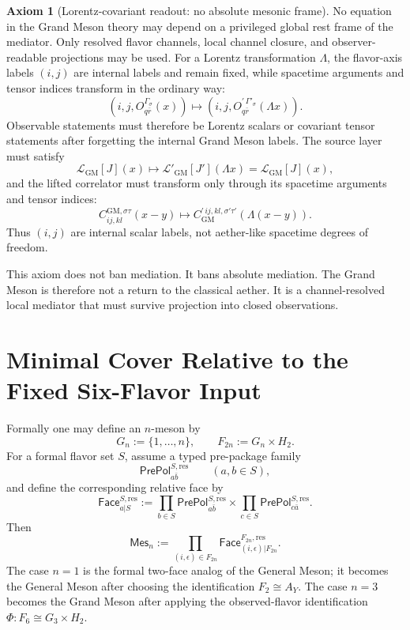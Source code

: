 \documentclass[11pt]{article}
\theoremstyle{definition}
\newtheorem{axiom}[definition]{Axiom}
\theoremstyle{plain}
\begin{document}
\begin{axiom}[Lorentz-covariant readout: no absolute mesonic frame]
No equation in the Grand Meson theory may depend on a privileged global
rest frame of the mediator.  Only resolved flavor channels, local channel closure, and
observer-readable projections may be used.
For a Lorentz transformation \(\Lambda\), the flavor-axis labels
\((i,j)\) are internal labels and remain fixed, while spacetime arguments
and tensor indices transform in the ordinary way:
\[
  (i,j,O^{\Gamma_\sigma}_{q\bar r}(x))
  \longmapsto
  (i,j,O^{\prime\,\Gamma'_\sigma}_{q\bar r}(\Lambda x)).
\]
Observable statements must therefore be Lorentz scalars or covariant tensor
statements after forgetting the internal Grand Meson labels.
The source layer must satisfy
\[
  \mathcal L_{\mathrm{GM}}[J](x)
  \longmapsto
  \mathcal L'_{\mathrm{GM}}[J'](\Lambda x)
  =
  \mathcal L_{\mathrm{GM}}[J](x),
\]
and the lifted correlator must transform only through its spacetime
arguments and tensor indices:
\[
  C^{\mathrm{GM},\sigma\tau}_{ij,kl}(x-y)
  \longmapsto
  C_{\mathrm{GM}}^{\prime\,ij,kl,\sigma'\tau'}(\Lambda(x-y)).
\]
Thus \((i,j)\) are internal scalar labels, not aether-like spacetime
degrees of freedom.
\end{axiom}

This axiom does not ban mediation.  It bans absolute mediation.  The Grand
Meson is therefore not a return to the classical aether.  It is a
channel-resolved local mediator that must survive projection into closed
observations.

\section{Minimal Cover Relative to the Fixed Six-Flavor Input}

Formally one may define an \(n\)-meson by
\[
  G_n:=\{1,\ldots,n\},
  \qquad
  F_{2n}:=G_n\times H_2 .
\]
For a formal flavor set \(S\), assume a typed pre-package family
\[
  \mathsf{PrePol}^{S,\mathrm{res}}_{a\bar b}
  \qquad(a,b\in S),
\]
and define the corresponding relative face by
\[
  \mathsf{Face}^{S,\mathrm{res}}_{a|S}
  :=
  \prod_{b\in S}\mathsf{PrePol}^{S,\mathrm{res}}_{a\bar b}
  \times
  \prod_{c\in S}\mathsf{PrePol}^{S,\mathrm{res}}_{c\bar a}.
\]
Then
\[
  \mathsf{Mes}_n
  :=
  \prod_{(i,\epsilon)\in F_{2n}}
  \mathsf{Face}^{F_{2n},\mathrm{res}}_{(i,\epsilon)|F_{2n}} .
\]
The case \(n=1\) is the formal two-face analog of the General Meson; it
becomes the General Meson after choosing the identification
\(F_2\cong A_Y\).  The case \(n=3\) becomes the Grand Meson after applying
the observed-flavor identification \(\Phi:F_6\cong G_3\times H_2\).
\end{document}
